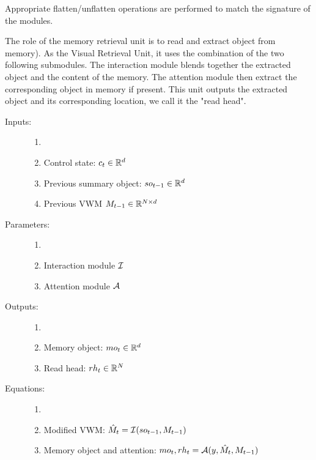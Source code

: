 \begin{note}
	Appropriate flatten/unflatten operations are performed to match the signature 
	of the modules.
\end{note}



The role of the memory retrieval unit is to read and extract object from memory).
As the Visual Retrieval Unit, it uses the combination of the two following submodules. The interaction module blends together the extracted object and the content of the memory. The attention module then extract the corresponding object in memory if present. This unit outputs the extracted object and its corresponding location, we call it the "read head".

\begin{description}
	\item[Inputs:] 
	\begin{enumerate}
		\item[]
		\item Control state: $c_t \in \mathbb{R}^d$	
		\item Previous summary object: $so_{t-1} \in  \mathbb{R}^d$
		\item Previous VWM $M_{t-1} \in \mathbb{R}^{N \times d}$
	\end{enumerate}
	
	\item[Parameters:] 
	\begin{enumerate}
		\item[]
		\item Interaction module $\mathcal{I}$
		\item Attention module $\mathcal{A}$
	\end{enumerate}
	
	\item[Outputs:] 
	\begin{enumerate}
		\item[]
		\item Memory object: $mo_t \in \mathbb{R}^d$
		\item Read head: $rh_t \in \mathbb{R}^N$
	\end{enumerate}
	
	\item[Equations:]
	\begin{enumerate}
		\item[]
		\item Modified VWM: $\hat{M}_t = \mathcal{I}(so_{t-1}, M_{t-1})$
		\item Memory object and attention: $mo_t, rh_t = \mathcal{A}(y, \hat{M}_t, M_{t-1})$
	\end{enumerate}
\end{description}


